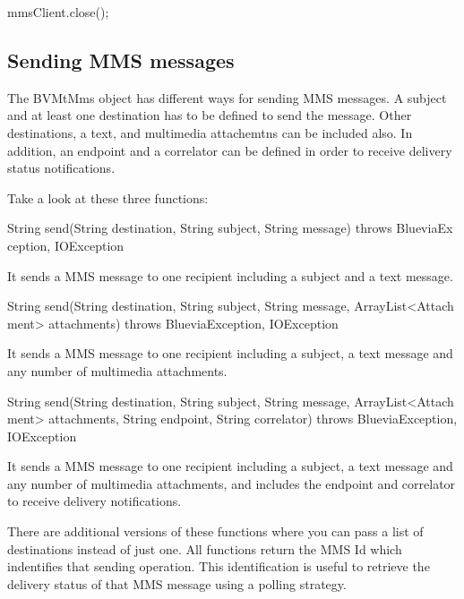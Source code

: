 \begin{DoxyCode}
mmsClient.close();
\end{DoxyCode}
\hypertarget{blv_mms_mt_guide_sending_mms_messages_sec}{}\subsection{Sending MMS messages}\label{blv_mms_mt_guide_sending_mms_messages_sec}
The BVMtMms object has different ways for sending MMS messages. A subject and at least one destination has to be defined to send the message. Other destinations, a text, and multimedia attachemtns can be included also. In addition, an endpoint and a correlator can be defined in order to receive delivery status notifications.

Take a look at these three functions:


\begin{DoxyCode}
 String send(String destination, String subject, String message) throws BlueviaEx
      ception, IOException
\end{DoxyCode}


It sends a MMS message to one recipient including a subject and a text message.


\begin{DoxyCode}
 String send(String destination, String subject, String message, ArrayList<Attach
      ment> attachments) throws BlueviaException, IOException
\end{DoxyCode}


It sends a MMS message to one recipient including a subject, a text message and any number of multimedia attachments.


\begin{DoxyCode}
 String send(String destination, String subject, String message, ArrayList<Attach
      ment> attachments, 
        String endpoint, String correlator) throws BlueviaException, IOException 
      
\end{DoxyCode}


It sends a MMS message to one recipient including a subject, a text message and any number of multimedia attachments, and includes the endpoint and correlator to receive delivery notifications.

There are additional versions of these functions where you can pass a list of destinations instead of just one. All functions return the MMS Id which indentifies that sending operation. This identification is useful to retrieve the delivery status of that MMS message using a polling strategy.


